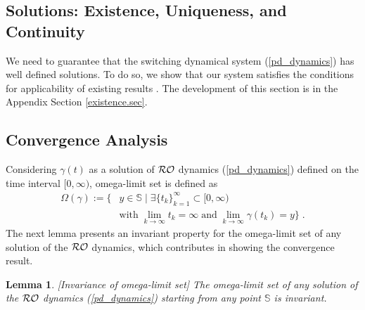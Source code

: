 \documentclass[journal,twoside,web]{ieeecolor}
\newtheorem{lemma}{Lemma}
\begin{document}
\subsection{Solutions: Existence, Uniqueness, and Continuity}
We need to guarantee that the switching dynamical system (\ref{pd_dynamics}) has well defined solutions.
To do so, we show that our system satisfies the conditions for applicability of existing results \cite{cherukuri2016}. The development of this section is in the Appendix Section \ref{existence.sec}.

\subsection{Convergence Analysis}
Considering $\gamma(t)$ as a solution of ${\cal RO}$ dynamics (\ref{pd_dynamics}) defined on the time interval $[0,\infty)$, omega-limit set is defined as
\begin{align} \label{omega_limit}
\Omega(\gamma):=\{& y \in \mathbb S \;|\; \exists \{t_k\}_{k=1}^\infty \subset [0,\infty) \nonumber\\
&\text{with}\; \lim_{k \rightarrow \infty} t_k=\infty \;\text{and}\; \lim_{k \rightarrow \infty} \gamma(t_k)=y\}\;.
\end{align}
The next lemma presents an invariant property for the omega-limit set of any solution of the ${\cal RO}$ dynamics, which contributes in showing the convergence result.
\begin{lemma}\cite[Lemma~4.4]{cherukuri2016}[Invariance of omega-limit set]
The omega-limit set of any solution of the ${\cal RO}$ dynamics (\ref{pd_dynamics}) starting from any point $\mathbb S$ is invariant.
\label{omega_invariance}
\end{lemma}
\end{document}
